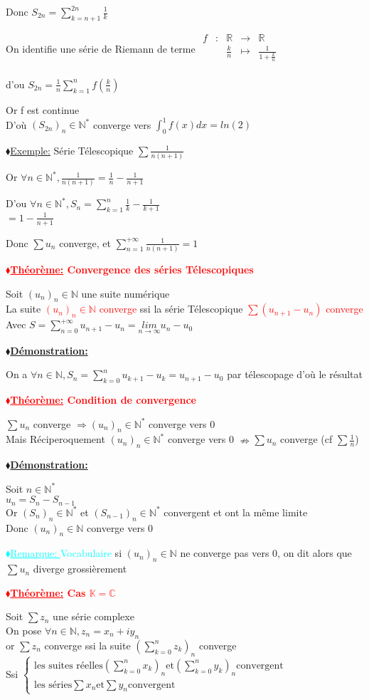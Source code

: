\documentclass[12pt]{report}
\newcommand{\rd}[1]{\textcolor{red}{#1}}
\newcommand{\cy}[1]{\textcolor{cyan}{#1}}
\newcommand{\blz}{$\blacklozenge$}
\newcommand{\ns}{\\\indent\indent\vspace{0.25cm}}
\newcommand{\rem}[1]
{
\cy{\underline{\blz Remarque: }#1}\vspace{0.5cm}
}
\newcommand{\props}[1]
{
\begin{mybox}
\textbf{\rd{\underline{\blz Théorème:} #1}}
\vspace{0.5cm}
\newline
}
\newcommand{\prope}
{
\end{mybox}
}
\newcommand{\demos}[1]
{
\begin{demo}
\textbf{\underline{\blz Démonstration:} #1}
\newline
}
\newcommand{\demoe}
{
\end{demo}
}
\newcommand{\exe}[1]
{
\underline{\blz Exemple:} #1
}
\newcommand{\R}{\mathbb{R}}
\newcommand{\C}{\mathbb{C}}
\newcommand{\N}{\mathbb{N}}
\newcommand{\K}{\mathbb{K}}
\newcommand{\nint}[1]{#1 \in \N}
\newcommand{\zint}[1]{#1 \in \N^*}
\newcommand{\limi}[1]{\underset{#1 \to \infty}{lim}}
\newcommand{\uns}{(u_n)_\nint{n}}
\newcommand{\seriegu}{\sum u_n}
\newcommand{\harmonique}{\sum \frac{1}{n}}
\newcommand{\serie}[3]{\sum_{#1}^{#2}{#3}}
\newcommand{\fct}[5]
	{
	  \begin{array}{ccccc}
		#1 & : & #2 & \to & #3 \\
	    && #4 & \mapsto & #5 \\
	  \end{array}
	}
\begin{document}
Donc $S_{2n} = \sum_{k = n+1}^{2n} \frac{1}{k}$

On identifie une série de Riemann de terme $\fct{f}{\R}{\R}{\frac{k}{n}}{\frac{1}{1+\frac{k}{n}}}$

d'ou $S_{2n} = \frac{1}{n} \serie{k=1}{n}{f(\frac{k}{n})}$\ns

Or f est continue\\
D'où $(S_{2n})_\zint{n}$ converge vers $\int_0^1 f(x)dx = ln(2)$\ns

\exe{Série Télescopique} $\sum \frac{1}{n(n+1)}$

Or $\forall \zint{n} , \frac{1}{n(n+1)} = \frac{1}{n} - \frac{1}{n+1}$

D'ou $\forall \zint{n}, S_n = \serie{k=1}{n}{\frac{1}{k}-\frac{1}{k+1}} $ \ns
$= 1 - \frac{1}{n+1}$

Donc $\seriegu$ converge, et $\serie{n=1}{+\infty}{\frac{1}{n(n+1)}} =1$

\props{Convergence des séries Télescopiques}
Soit $(u_n)_\nint{n}$ une suite numérique\\
La suite \rd{$(u_n)_\nint{n}$ converge} ssi la série Télescopique \rd{$\sum (u_{n+1} -u_n)$ converge}\\

Avec $S = \serie{n=0}{+\infty}{u_{n+1}-u_n} = \limi{n}u_n -u_0$
\prope

\demos{}
On a $\forall \nint{n}, S_n = \serie{k=0}{n}{u_{k+1}-u_k} = u_{n+1}-u_0$ par télescopage d'où le résultat
\demoe

\props{Condition de convergence}
$\seriegu$ converge $\Rightarrow (u_n)_\zint{n}$ converge vers 0 \\
Mais Réciperoquement $(u_n)_\zint{n}$ converge vers 0 $\nRightarrow \seriegu$ converge (cf $\harmonique$)
\prope

\demos{}
Soit $\zint{n}$\\
$u_n = S_n - S_{n-1}$\ns
Or $(S_n)_\zint{n}$ et $(S_{n-1})_\zint{n}$ convergent et ont la même limite\\
Donc $\uns$ converge vers 0
\demoe

\rem{Vocabulaire} si $\uns$ ne converge pas vers 0, on dit alors que $\seriegu$ diverge grossièrement

\props{Cas $\K = \C$}
Soit $\sum z_n$ une série complexe\\
On pose $\forall \nint{n}, z_n =x_n +iy_n$\\
or $\sum z_n $ converge ssi la suite $(\serie{k=0}{n}{z_k})_n$ converge\\
Ssi $\begin{cases}
\text{les suites réelles} (\serie{k=0}{n}{x_k})_n \text{et} (\serie{k=0}{n}{y_k})_n \text{convergent}\\
\text{les séries} \sum x_n \text{et} \sum y_n \text{convergent}
\end{cases}$
\prope
\end{document}
